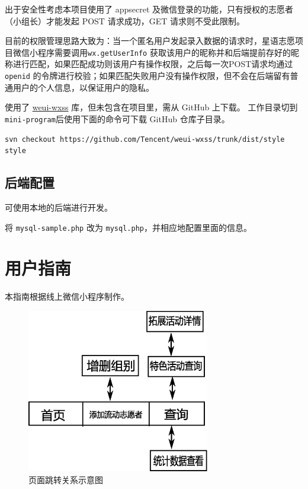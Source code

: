 \documentclass[]{ctexart}
\begin{document}
出于安全性考虑本项目使用了 appsecret
及微信登录的功能，只有授权的志愿者（小组长）才能发起 POST 请求成功，GET
请求则不受此限制。

目前的权限管理思路大致为：当一个匿名用户发起录入数据的请求时，星语志愿项目微信小程序需要调用\texttt{wx.getUserInfo}
获取该用户的昵称并和后端提前存好的昵称进行匹配，如果匹配成功则该用户有操作权限，之后每一次POST请求均通过
\texttt{openid}
的令牌进行校验；如果匹配失败用户没有操作权限，但不会在后端留有普通用户的个人信息，以保证用户的隐私。

使用了 \href{https://github.com/Tencent/weui-wxss}{weui-wxss}
库，但未包含在项目里，需从 GitHub 上下载。 工作目录切到
\texttt{mini-program}后使用下面的命令可下载 GitHub 仓库子目录。

\begin{lstlisting}[breaklines=true]
svn checkout https://github.com/Tencent/weui-wxss/trunk/dist/style style
\end{lstlisting}



\subsection{后端配置}\label{ux540eux7aefux914dux7f6e}

可使用本地的后端进行开发。

将 \texttt{mysql-sample.php} 改为
\texttt{mysql.php}，并相应地配置里面的信息。

\section{用户指南}
本指南根据线上微信小程序制作。
\begin{figure}[!ht]
\centering
\includegraphics[width=8cm]{assets/pages.eps}
\caption{页面跳转关系示意图}\label{jump}
\end{figure}
\end{document}
